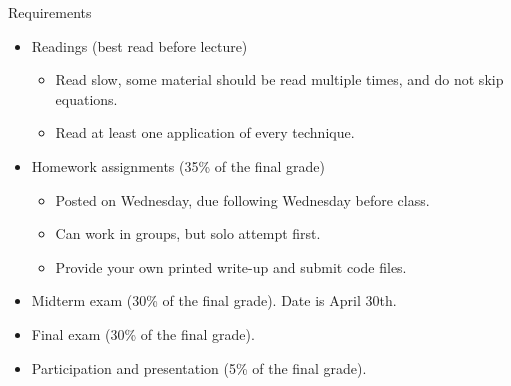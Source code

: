 \documentclass{beamer}
\numberwithin{equation}{section}
\begin{document}
\begin{frame}{Requirements}

\begin{itemize}
\itemsep1pt\parskip0pt
\item
  Readings (best read before lecture)

  \begin{itemize}
  \itemsep1pt\parskip0pt
  \item
    Read slow, some material should be read multiple times, and do not skip equations.
  \item
    Read at least one application of every technique.
  \end{itemize}\medskip
\item
  Homework assignments (35\% of the final grade)

  \begin{itemize}
  \itemsep1pt\parskip0pt
    \item
    Posted on Wednesday, due following Wednesday before class.
  \item Can work in groups, but solo attempt first.
  \item Provide your own printed write-up and submit code files.

  \end{itemize}\medskip
   
 \item Midterm exam (30\% of the final grade). Date is April 30th. \medskip
  \item Final exam   (30\% of the final grade).\medskip
\item
  Participation and presentation (5\% of the final grade).
\end{itemize}

\end{frame}

%
%
%
\end{document}
